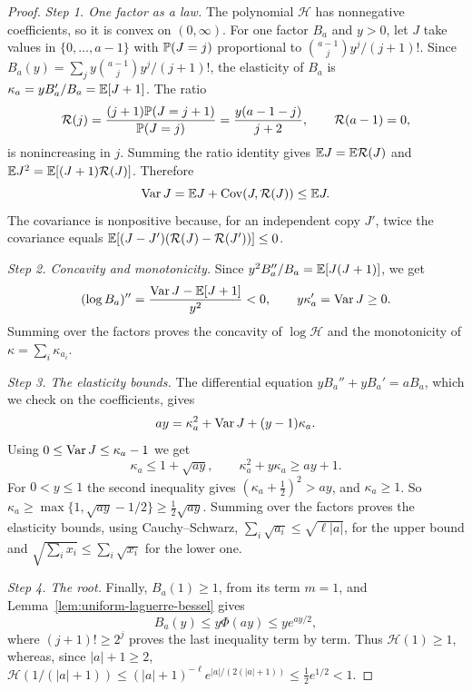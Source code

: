 \begin{proof}
\emph{Step 1. One factor as a law.} The polynomial $\mathcal H$ has
nonnegative coefficients, so it is convex on $(0,\infty)$. For one factor $B_a$ and $y>0$, let $J$ take values in
$\{0,\ldots,a-1\}$ with $\mathbb P(J=j)$ proportional to $\binom{a-1}{j}y^j/(j+1)!$.
Since $B_a(y)=\sum_jy\binom{a-1}jy^j/(j+1)!$, the elasticity of $B_a$ is
$\kappa_a=yB_a'/B_a=\mathbb E[J+1]$. The ratio
\[
\mathcal R(j)=\frac{(j+1)\mathbb P(J=j+1)}{\mathbb P(J=j)}=\frac{y(a-1-j)}{j+2},
\qquad \mathcal R(a-1)=0,
\]
is nonincreasing in $j$. Summing the ratio identity gives
$\mathbb E J=\mathbb E \mathcal R(J)$ and $\mathbb E J^2=\mathbb E[(J+1)\mathcal R(J)]$. Therefore
\[
 \operatorname{Var} J=\mathbb E J+\operatorname{Cov}(J,\mathcal R(J))\le \mathbb E J.
\]
The covariance is nonpositive because, for an independent copy $J'$,
twice the covariance equals $\mathbb E[(J-J')(\mathcal R(J)-\mathcal R(J'))]\le0$.

\emph{Step 2. Concavity and monotonicity.} Since
$y^2B_a''/B_a=\mathbb E[J(J+1)]$, we get
\[
 (\log B_a)''=\frac{\operatorname{Var} J-\mathbb E[J+1]}{y^2}<0,
 \qquad y\kappa_a'=\operatorname{Var} J\ge0.
\]
Summing over the factors proves the concavity of $\log\mathcal H$ and the monotonicity
of $\kappa=\sum_i\kappa_{a_i}$.

\emph{Step 3. The elasticity bounds.} The differential equation
$yB_a''+yB_a'=aB_a$, which we check on the coefficients, gives
\[
 ay=\kappa_a^2+\operatorname{Var} J+(y-1)\kappa_a.
\]
Using $0\le\operatorname{Var} J\le\kappa_a-1$ we get
\[
 \kappa_a\le1+\sqrt{ay},\qquad \kappa_a^2+y\kappa_a\ge ay+1.
\]
For $0<y\le1$ the second inequality gives $(\kappa_a+\frac12)^2>ay$, and
$\kappa_a\ge1$. So $\kappa_a\ge\max\{1,\sqrt{ay}-1/2\}\ge\tfrac12\sqrt{ay}$.
Summing over the factors proves the elasticity bounds, using
Cauchy--Schwarz, $\sum_i\sqrt{a_i}\le\sqrt{\ell|a|}$, for the upper bound and
$\sqrt{\sum_ix_i}\le\sum_i\sqrt{x_i}$ for the lower one.

\emph{Step 4. The root.} Finally, $B_a(1)\ge1$, from its term $m=1$, and
Lemma~\ref{lem:uniform-laguerre-bessel} gives
\[
 B_a(y)\le y\Phi(ay)\le y e^{ay/2},
\]
where $(j+1)!\ge2^j$ proves the last inequality term by term.
Thus $\mathcal H(1)\ge1$, whereas, since $|a|+1\ge2$,
$\mathcal H(1/(|a|+1))\le(|a|+1)^{-\ell}e^{|a|/(2(|a|+1))}\le\frac12e^{1/2}<1$.
\end{proof}

